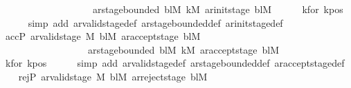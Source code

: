 \begin{isabellebody}
\ \ \ \ \ \ \ \ \ \ \ \ \ \ \ \ \ \ {\isasymand}\ ar{\isacharunderscore}{\kern0pt}stage{\isacharunderscore}{\kern0pt}bounded\ bl\isactrlsub M\ k\isactrlsub M\ {\isacharparenleft}{\kern0pt}ar{\isacharunderscore}{\kern0pt}init{\isacharunderscore}{\kern0pt}stage\ bl\isactrlsub M{\isacharparenright}{\kern0pt}{\isachardoublequoteclose}\isanewline
\ \ \ \ \isamarkupfalse%
\ kfor{}\ kpos\isanewline
\ \ \ \ \isamarkupfalse%
\ {\isacharparenleft}{\kern0pt}simp\ add{\isacharcolon}{\kern0pt}\ ar{\isacharunderscore}{\kern0pt}valid{\isacharunderscore}{\kern0pt}stage{\isacharunderscore}{\kern0pt}def\ ar{\isacharunderscore}{\kern0pt}stage{\isacharunderscore}{\kern0pt}bounded{\isacharunderscore}{\kern0pt}def\ ar{\isacharunderscore}{\kern0pt}init{\isacharunderscore}{\kern0pt}stage{\isacharunderscore}{\kern0pt}def{\isacharparenright}{\kern0pt}\isanewline
\ \ \isamarkupfalse%
\ acc{\isacharunderscore}{\kern0pt}P{\isacharcolon}{\kern0pt}\ {\isachardoublequoteopen}ar{\isacharunderscore}{\kern0pt}valid{\isacharunderscore}{\kern0pt}stage\ {\isasymGamma}\isactrlsub M\ bl\isactrlsub M\ {\isacharparenleft}{\kern0pt}ar{\isacharunderscore}{\kern0pt}accept{\isacharunderscore}{\kern0pt}stage\ bl\isactrlsub M{\isacharparenright}{\kern0pt}\isanewline
\ \ \ \ \ \ \ \ \ \ \ \ \ \ \ \ \ {\isasymand}\ ar{\isacharunderscore}{\kern0pt}stage{\isacharunderscore}{\kern0pt}bounded\ bl\isactrlsub M\ k\isactrlsub M\ {\isacharparenleft}{\kern0pt}ar{\isacharunderscore}{\kern0pt}accept{\isacharunderscore}{\kern0pt}stage\ bl\isactrlsub M{\isacharparenright}{\kern0pt}{\isachardoublequoteclose}\isanewline
\ \ \ \ \isamarkupfalse%
\ kfor{}\ kpos\isanewline
\ \ \ \ \isamarkupfalse%
\ {\isacharparenleft}{\kern0pt}simp\ add{\isacharcolon}{\kern0pt}\ ar{\isacharunderscore}{\kern0pt}valid{\isacharunderscore}{\kern0pt}stage{\isacharunderscore}{\kern0pt}def\ ar{\isacharunderscore}{\kern0pt}stage{\isacharunderscore}{\kern0pt}bounded{\isacharunderscore}{\kern0pt}def\ ar{\isacharunderscore}{\kern0pt}accept{\isacharunderscore}{\kern0pt}stage{\isacharunderscore}{\kern0pt}def{\isacharparenright}{\kern0pt}\isanewline
\ \ \isamarkupfalse%
\ rej{\isacharunderscore}{\kern0pt}P{\isacharcolon}{\kern0pt}\ {\isachardoublequoteopen}ar{\isacharunderscore}{\kern0pt}valid{\isacharunderscore}{\kern0pt}stage\ {\isasymGamma}\isactrlsub M\ bl\isactrlsub M\ {\isacharparenleft}{\kern0pt}ar{\isacharunderscore}{\kern0pt}reject{\isacharunderscore}{\kern0pt}stage\ bl\isactrlsub M{\isacharparenright}{\kern0pt}\isanewline

\end{isabellebody}
